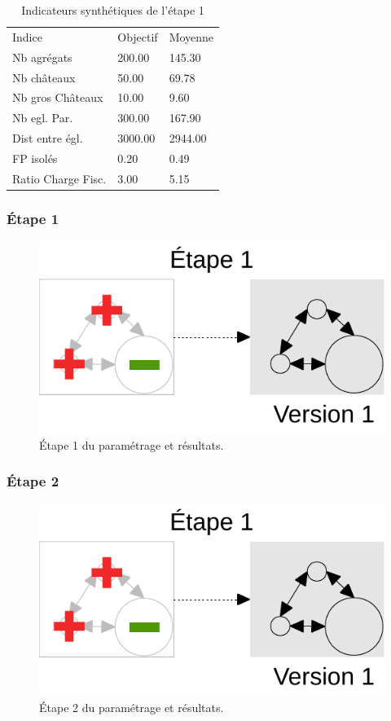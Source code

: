\begin{table}[H]
	\centering
	\caption{Indicateurs synthétiques de l'étape 1}
	\label{my-label}
	\begin{tabular}{lll}
		Indice             & Objectif & Moyenne \\
		Nb agrégats       & 200.00   & 145.30  \\
		Nb châteaux       & 50.00    & 69.78   \\
		Nb gros  Châteaux & 10.00    & 9.60    \\
		Nb egl. Par.       & 300.00   & 167.90  \\
		Dist entre égl.   & 3000.00  & 2944.00 \\
		FP isolés         & 0.20     & 0.49    \\
		Ratio Charge Fisc. & 3.00     & 5.15    
	\end{tabular}
\end{table}

\pagebreak
\subsubsection{Étape 1}
\begin{figure}[H]
	\centering
	\includegraphics[width = \linewidth, page = 1]{img/schemas_etapes_individuelles.pdf}
	\caption{Étape 1 du paramétrage et résultats.}
\end{figure}

\pagebreak
\subsubsection{Étape 2}
\begin{figure}[H]
	\centering
	\includegraphics[width = \linewidth, page = 2]{img/schemas_etapes_individuelles.pdf}
	\caption{Étape 2 du paramétrage et résultats.}
\end{figure}

